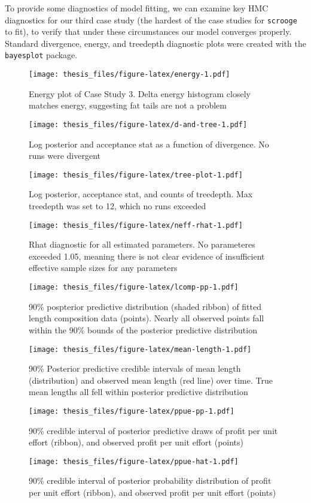 \documentclass[twoside,12pt,final]{ucthesis-CA2012}
\begin{document}
\begin{ucmainmatter}
To provide some diagnostics of model fitting, we can examine key HMC
diagnostics for our third case study (the hardest of the case studies
for \texttt{scrooge} to fit), to verify that under these circumstances
our model converges properly. Standard divergence, energy, and treedepth
diagnostic plots were created with the \texttt{bayesplot} package.
\begin{figure}
\centering
\texttt{[image: thesis\_files/figure-latex/energy-1.pdf]}
\caption{\label{fig:energy}Energy plot of Case Study 3. Delta energy
histogram closely matches energy, suggesting fat tails are not a
problem}
\end{figure}
\begin{figure}
\centering
\texttt{[image: thesis\_files/figure-latex/d-and-tree-1.pdf]}
\caption{\label{fig:d-and-tree}Log posterior and acceptance stat as a
function of divergence. No runs were divergent}
\end{figure}
\begin{figure}
\centering
\texttt{[image: thesis\_files/figure-latex/tree-plot-1.pdf]}
\caption{\label{fig:tree-plot}Log posterior, acceptance stat, and counts of
treedepth. Max treedepth was set to 12, which no runs exceeded}
\end{figure}
\begin{figure}
\centering
\texttt{[image: thesis\_files/figure-latex/neff-rhat-1.pdf]}
\caption{\label{fig:neff-rhat}Rhat diagnostic for all estimated parameters.
No parameteres exceeded 1.05, meaning there is not clear evidence of
insufficient effective sample sizes for any parameters}
\end{figure}
\begin{figure}
\centering
\texttt{[image: thesis\_files/figure-latex/lcomp-pp-1.pdf]}
\caption{\label{fig:lcomp-pp}90\% pospterior predictive distribution (shaded
ribbon) of fitted length composition data (points). Nearly all observed
points fall within the 90\% bounds of the posterior predictive
distribution}
\end{figure}
\begin{figure}
\centering
\texttt{[image: thesis\_files/figure-latex/mean-length-1.pdf]}
\caption{\label{fig:mean-length} 90\% Posterior predictive credible
intervals of mean length (distribution) and observed mean length (red
line) over time. True mean lengths all fell within posterior predictive
distribution}
\end{figure}
\begin{figure}
\centering
\texttt{[image: thesis\_files/figure-latex/ppue-pp-1.pdf]}
\caption{\label{fig:ppue-pp}90\% credible interval of posterior predictive
draws of profit per unit effort (ribbon), and observed profit per unit
effort (points)}
\end{figure}
\begin{figure}
\centering
\texttt{[image: thesis\_files/figure-latex/ppue-hat-1.pdf]}
\caption{\label{fig:ppue-hat}90\% credible interval of posterior probability
distribution of profit per unit effort (ribbon), and observed profit per
unit effort (points)}
\end{figure}

\end{ucmainmatter}
\end{document}
